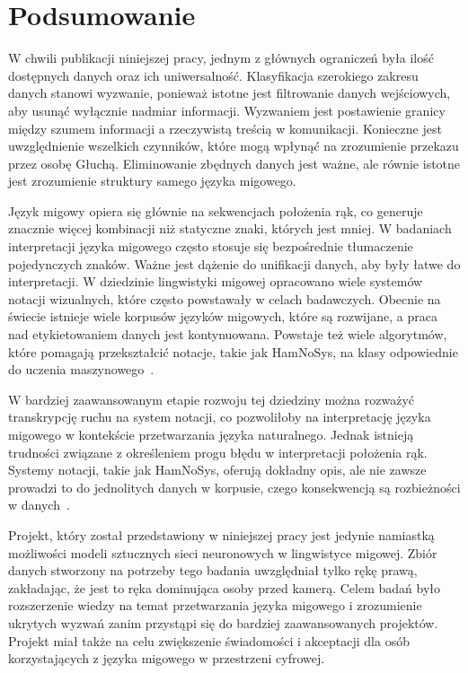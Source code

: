 \hypersetup{pageanchor=true}

\chapter{Podsumowanie}\label{ch:summary}

W chwili publikacji niniejszej pracy, jednym z głównych ograniczeń była ilość dostępnych danych oraz ich uniwersalność. Klasyfikacja szerokiego zakresu danych stanowi wyzwanie, ponieważ istotne jest filtrowanie danych wejściowych, aby usunąć wyłącznie nadmiar informacji. Wyzwaniem jest postawienie granicy między szumem informacji a rzeczywistą treścią w komunikacji. Konieczne jest uwzględnienie wszelkich czynników, które mogą wpłynąć na zrozumienie przekazu przez osobę Głuchą. Eliminowanie zbędnych danych jest ważne, ale równie istotne jest zrozumienie struktury samego języka migowego.

Język migowy opiera się głównie na sekwencjach położenia rąk, co generuje znacznie więcej kombinacji niż statyczne znaki, których jest mniej. W badaniach interpretacji języka migowego często stosuje się bezpośrednie tłumaczenie pojedynczych znaków. Ważne jest dążenie do unifikacji danych, aby były łatwe do interpretacji. W dziedzinie lingwistyki migowej opracowano wiele systemów notacji wizualnych, które często powstawały w celach badawczych. Obecnie na świecie istnieje wiele korpusów języków migowych, które są rozwijane, a praca nad etykietowaniem danych jest kontynuowana. Powstaje też wiele algorytmów, które pomagają przekształcić notacje, takie jak HamNoSys, na klasy odpowiednie do uczenia maszynowego~\cite{majchrowska2022}.

W bardziej zaawansowanym etapie rozwoju tej dziedziny można rozważyć transkrypcję ruchu na system notacji, co pozwoliłoby na interpretację języka migowego w kontekście przetwarzania języka naturalnego. Jednak istnieją trudności związane z określeniem progu błędu w interpretacji położenia rąk. Systemy notacji, takie jak HamNoSys, oferują dokładny opis, ale nie zawsze prowadzi to do jednolitych danych w korpusie, czego konsekwencją są rozbieżności w danych~\cite{ferlin2023}.

Projekt, który został przedstawiony w niniejszej pracy jest jedynie namiastką możliwości modeli sztucznych sieci neuronowych w lingwistyce migowej. Zbiór danych stworzony na potrzeby tego badania uwzględniał tylko rękę prawą, zakładając, że jest to ręka dominująca osoby przed kamerą. Celem badań było rozszerzenie wiedzy na temat przetwarzania języka migowego i zrozumienie ukrytych wyzwań zanim przystąpi się do bardziej zaawansowanych projektów. Projekt miał także na celu zwiększenie świadomości i akceptacji dla osób korzystających z języka migowego w przestrzeni cyfrowej.
